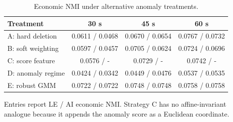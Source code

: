 
\begin{table}[!b]
\centering
\caption{Economic NMI under alternative anomaly treatments.}
\label{tab:alternative_anomaly_strategies}
\scriptsize
\setlength{\tabcolsep}{5pt}
\begin{tabular}{lccc}
\toprule
Treatment & 30 s & 45 s & 60 s\\
\midrule
A: hard deletion & 0.0611 / 0.0468 & 0.0670 / 0.0654 & 0.0767 / 0.0732\\
B: soft weighting & 0.0597 / 0.0457 & 0.0705 / 0.0624 & 0.0724 / 0.0696\\
C: score feature & 0.0576 / - & 0.0729 / - & 0.0742 / -\\
D: anomaly regime & 0.0424 / 0.0342 & 0.0449 / 0.0476 & 0.0537 / 0.0535\\
E: robust GMM & 0.0722 / 0.0722 & 0.0748 / 0.0748 & 0.0758 / 0.0758\\
\bottomrule
\end{tabular}
\begin{minipage}{0.94\linewidth}\footnotesize
Entries report LE / AI economic NMI.  Strategy C has no affine-invariant
analogue because it appends the anomaly score as a Euclidean coordinate.
\end{minipage}
\end{table}
